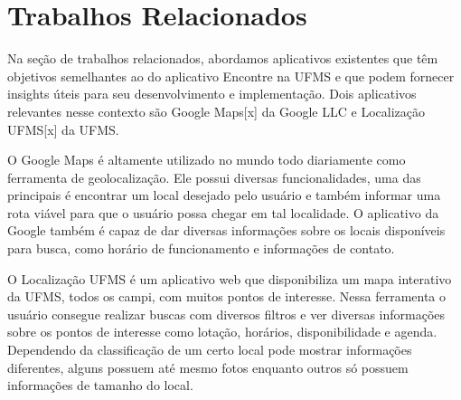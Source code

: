 \section{Trabalhos Relacionados}

Na seção de trabalhos relacionados, abordamos aplicativos existentes que têm objetivos semelhantes ao do aplicativo Encontre na UFMS e que podem fornecer insights úteis para seu desenvolvimento e implementação. Dois aplicativos relevantes nesse contexto são Google Maps[x] da Google LLC e Localização UFMS[x] da UFMS.

O Google Maps é altamente utilizado no mundo todo diariamente como ferramenta de geolocalização. Ele possui diversas funcionalidades, uma das principais é encontrar um local desejado pelo usuário e também informar uma rota viável para que o usuário possa chegar em tal localidade. O aplicativo da Google também é capaz de dar diversas informações sobre os locais disponíveis para busca, como horário de funcionamento e informações de contato.

O Localização UFMS é um aplicativo web que disponibiliza um mapa interativo da UFMS, todos os campi, com muitos pontos de interesse. Nessa ferramenta o usuário consegue realizar buscas com diversos filtros e ver diversas informações sobre os pontos de interesse como lotação, horários, disponibilidade e agenda. Dependendo da classificação de um certo local pode mostrar informações diferentes, alguns possuem até mesmo fotos enquanto outros só possuem informações de tamanho do local. 